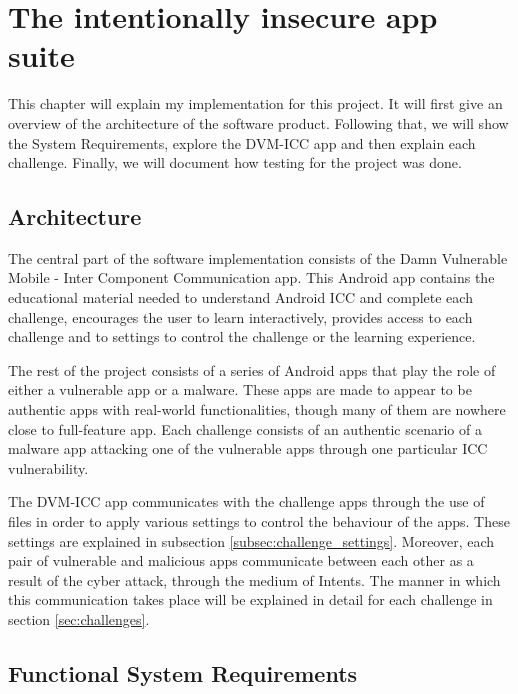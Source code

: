 \chapter{The intentionally insecure app suite}
    \label{chap:implementation}

   This chapter will explain my implementation for this project. It will first give an overview of the architecture of the software product. Following that, we will show the System Requirements, explore the DVM-ICC app and then explain each challenge. Finally, we will document how testing for the project was done.

    \section{Architecture} 
        \label{sec:architecture}
        
    The central part of the software implementation consists of the Damn Vulnerable Mobile - Inter Component Communication app. This Android app contains the educational material needed to understand Android ICC and complete each challenge, encourages the user to learn interactively, provides access to each challenge and to settings to control the challenge or the learning experience. 
    
    The rest of the project consists of a series of Android apps that play the role of either a vulnerable app or a malware. These apps are made to appear to be authentic apps with real-world functionalities, though many of them are nowhere close to full-feature app. Each challenge consists of an authentic scenario of a malware app attacking one of the vulnerable apps through one particular ICC vulnerability.
    
    The DVM-ICC app communicates with the challenge apps through the use of files in order to apply various settings to control the behaviour of the apps. These settings are explained in subsection \ref{subsec:challenge_settings}. Moreover, each pair of vulnerable and malicious apps communicate between each other as a result of the cyber attack, through the medium of Intents. The manner in which this communication takes place will be explained in detail for each challenge in section \ref{sec:challenges}.
    
    \section{Functional System Requirements}
    \label{sec:requirements}
    
